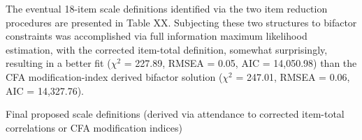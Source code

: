 \documentclass[
  english,
  man]{apa7}
\begin{document}
The eventual 18-item scale definitions identified via the two item reduction procedures are presented in Table XX. Subjecting these two structures to bifactor constraints was accomplished via full information maximum likelihood estimation, with the corrected item-total definition, somewhat surprisingly, resulting in a better fit (\(\chi^2\) = 227.89, RMSEA = 0.05, AIC = 14,050.98) than the CFA modification-index derived bifactor solution (\(\chi^2\) = 247.01, RMSEA = 0.06, AIC = 14,327.76).

\begin{table}[tbp]

\begin{center}
\begin{threeparttable}

\caption{\label{tab:scales}Final proposed scale definitions (derived via attendance to corrected item-total correlations or CFA modification indices)}


\end{threeparttable}
\end{center}
\end{table}
\end{document}
